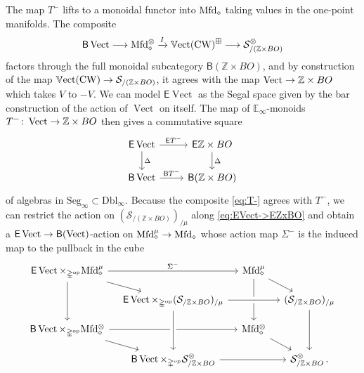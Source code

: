 \documentclass[10pt]{amsart}
\numberwithin{equation}{section}
\theoremstyle{definition}
\DeclareMathOperator{\op}{op}
\DeclareMathOperator{\Vect}{Vect}
\DeclareMathOperator{\bVect}{\mathbb{V}ect}
\DeclareMathOperator{\CW}{CW}
\newcommand{\Mfd}{\mathrm{Mfd}\vphantom{d}}
\newcommand{\bE}{\mathbb{E}}
\newcommand{\bZ}{\mathbb{Z}}
\newcommand{\Simp}{\mathbb{\Delta}}
\newcommand{\cS}{\mathcal{S}}
\newcommand{\sfB}{\mathsf{B}}
\newcommand{\sfE}{\mathsf{E}}
\newcommand{\Dbl}{\mathrm{Dbl}}
\newcommand{\Seg}{\mathrm{Seg}_{\infty}}
\renewcommand{\to}{\mathchoice{\longrightarrow}{\rightarrow}{}{}}
\begin{document}
The map $T^{-}$ lifts to a monoidal functor into $\Mfd_{\diamond}$ taking values in the one-point manifolds.
The composite
\begin{align}\label{eq:T-}
	\sfB \Vect \to \Mfd_{\diamond}^{\otimes} \xrightarrow{I} \bVect(\CW)^{\boxplus} \to \cS_{/ (\bZ\times BO)}^{\otimes}
\end{align}
factors through the full monoidal subcategory $\sfB(\bZ\times BO)$, and by construction of the map $\bVect(\CW) \to \cS_{/ (\bZ\times BO)}$, it agrees with the map $\Vect \to \bZ\times BO$ which takes $V$ to $-V$.
We can model $\sfE \Vect$ as the Segal space given by the bar construction of the action of $\Vect$ on itself.
The map of $\bE_{\infty}$-monoids $T^{-}\colon \Vect\to \bZ\times BO$ then gives a commutative square
\begin{equation}\label{eq:EVect->EZxBO}
	\begin{tikzcd}
		\sfE \Vect \arrow[r, "\sfE T^{-}"] \arrow[d, "\Delta"]      &   \sfE \bZ\times BO  \arrow[d, "\Delta"] \\
		\sfB \Vect  \arrow[r,"\sfB T^{-}"]               &   \sfB(\bZ\times BO)
	\end{tikzcd}
\end{equation}
of algebras in $\Seg \subset \Dbl_{\infty}$. Because the composite \eqref{eq:T-} agrees with $T^{-}$, we can restrict the action on $(\cS_{/ (\bZ\times BO)})_{/\mu}$ along \eqref{eq:EVect->EZxBO} and obtain a $\sfE\Vect \to \sfB(\Vect)$-action on $\Mfd^{\mu}_{\diamond}\to \Mfd_{\diamond}$ whose action map $\Sigma^{-}$ is the induced map to the pullback in the cube
\begin{equation*}
	\begin{tikzcd}[row sep=1em, column sep=1em]
		\sfE \Vect \times_{\Simp^{\op}} \Mfd^{\mu}_{\diamond} \arrow[rr, "\Sigma^{-}"] \arrow[dd] \arrow[dr] & & \Mfd_{\diamond}^{\mu} \arrow[dd] \arrow[dr] \\
		& \sfE \Vect \times_{\Simp^{\op}} (\cS_{/ \bZ\times BO})_{/\mu} \arrow[rr, crossing over]  & & (\cS_{/ \bZ\times BO})_{/\mu} \arrow[dd] \\
		\sfB\Vect \times_{\Simp^{\op}} \Mfd_{\diamond}^{\otimes} \arrow[rr] \arrow[dr] & & \Mfd_{\diamond}^{\otimes} \arrow[dr] \\
		& \sfB \Vect \times_{\Simp^{\op}} \cS_{/ \bZ\times BO}^{\otimes}  \arrow[rr] & & \cS_{/\bZ \times BO}^{\otimes} \,.
		\arrow[from=2-2, to= 4-2, crossing over]
	\end{tikzcd}
\end{equation*}
\end{document}
